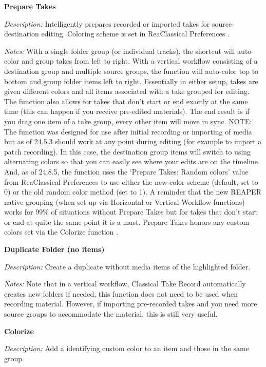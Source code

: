 \documentclass[10pt,american]{article}
\begin{document}
\textbf{Prepare Takes }

\emph{Description:} Intelligently prepares recorded or imported takes for
source-destination editing. Coloring scheme is set in ReaClassical Preferences
 .

\emph{Notes: }With a single folder group (or individual tracks), the shortcut
will auto-color and group takes from left to right. With a vertical workflow
consisting of a destination group and multiple source groups, the function will
auto-color top to bottom and group folder items left to right. Essentially in
either setup, takes are given different colors and all items associated with a
take grouped for editing. The function also allows for takes that don't start or
end exactly at the same time (this can happen if you receive pre-edited
materials). The end result is if you drag one item of a take group, every other
item will move in sync. NOTE: The function was designed for use after initial
recording or importing of media but as of 24.5.3 should work at any point during
editing (for example to import a patch recording). In this case, the destination
group items will switch to using alternating colors so that you can easily see
where your edits are on the timeline. And, as of 24.8.5, the function uses the
`Prepare Takes: Random colors' value from ReaClassical Preferences to use either
the new color scheme (default, set to 0) or the old random color method (set to
1). A reminder that the new REAPER native grouping (when set up via Horizontal
or Vertical Workflow functions) works for 99\% of situations without Prepare
Takes but for takes that don't start or end at quite the same point it is a
must. Prepare Takes honors any custom colors set via the Colorize function
.

\textbf{Duplicate Folder (no items) }\keys{\textbackslash}

\emph{Description: }Create a duplicate without media items of the highlighted
folder.

\emph{Notes: }Note that in a vertical workflow, Classical Take Record 
automatically creates new folders if needed, this function does not need to be
used when recording material. However, if importing pre-recorded takes and you
need more source groups to accommodate the material, this is still very useful.

\textbf{Colorize }

\emph{Description: }Add a identifying custom color to an item and those in the
same group.
\end{document}
